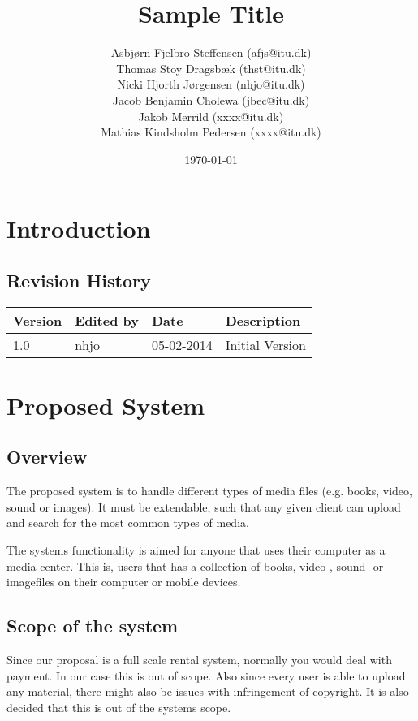 \documentclass{report}
\title{Sample Title}
\date{\today}
\author{Asbj\o rn Fjelbro Steffensen (afjs@itu.dk)\\ Thomas Stoy Dragsb\ae k (thst@itu.dk)\\ Nicki Hjorth J\o rgensen (nhjo@itu.dk)\\ Jacob Benjamin Cholewa (jbec@itu.dk)\\ Jakob Merrild (xxxx@itu.dk)\\ Mathias Kindsholm Pedersen (xxxx@itu.dk)}
\begin{document}
\maketitle
\newpage
\tableofcontents

\chapter{Introduction}

\section{Revision History}
\begin{center}
\begin{tabularx}{\textwidth}{|X|X|X|X|}
\hline
\textbf{Version} & \textbf{Edited by} & \textbf{Date} & \textbf{Description} \\
\hline
1.0 & nhjo & 05-02-2014 & Initial Version \\
\hline

\end{tabularx}
\end{center}

\chapter{Proposed System}

\section{Overview}
The proposed system is to handle different types of media files (e.g. books, video, sound or images). It must be extendable, such that any given client can upload and search for the most common types of media.

The systems functionality is aimed for anyone that uses their computer as a media center. This is, users that has a collection of books, video-, sound- or imagefiles on their computer or mobile devices.

\section{Scope of the system}

Since our proposal is a full scale rental system, normally you would deal with payment. In our case this is out of scope. Also since every user is able to upload any material, there might also be  issues with infringement of copyright. It is also decided that this is out of the systems scope.
\end{document}

